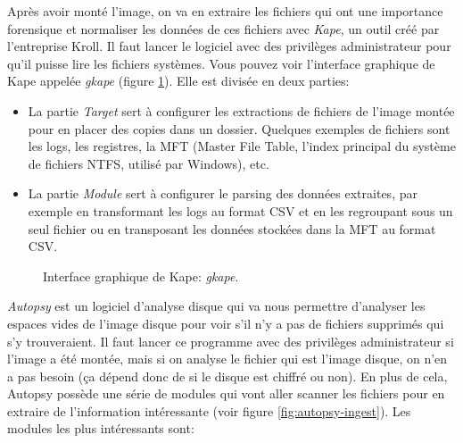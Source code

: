 Après avoir monté l'image, on va en extraire les fichiers qui ont une importance forensique et normaliser les données de ces fichiers avec \textit{Kape}, un outil créé par l'entreprise Kroll. Il faut lancer le logiciel avec des privilèges administrateur pour qu'il puisse lire les fichiers systèmes. Vous pouvez voir l'interface graphique de Kape appelée \textit{gkape} (figure \ref{fig:gkape}). Elle est divisée en deux parties:

\begin{itemize}
    \item La partie \textit{Target} sert à configurer les extractions de fichiers de l'image montée pour en placer des copies dans un dossier. Quelques exemples de fichiers sont les logs, les registres, la MFT (Master File Table, l'index principal du système de fichiers NTFS, utilisé par Windows), etc.
    \item La partie \textit{Module} sert à configurer le parsing des données extraites, par exemple en transformant les logs au format CSV et en les regroupant sous un seul fichier ou en transposant les données stockées dans la MFT au format CSV.
\end{itemize}

\begin{figure}
    \centering
    \caption{Interface graphique de Kape: \textit{gkape}.}
    \label{fig:gkape}
\end{figure}


\textit{Autopsy} est un logiciel d'analyse disque qui va nous permettre d'analyser les espaces vides de l'image disque pour voir s'il n'y a pas de fichiers supprimés qui s'y trouveraient. Il faut lancer ce programme avec des privilèges administrateur si l'image a été montée, mais si on analyse le fichier qui est l'image disque, on n'en a pas besoin (ça dépend donc de si le disque est chiffré ou non). En plus de cela, Autopsy possède une série de modules qui vont aller scanner les fichiers pour en extraire de l'information intéressante (voir figure \ref{fig:autopsy-ingest}). Les modules les plus intéressants sont:

